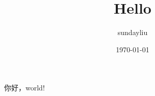 \documentclass[UTF8]{ctexart}
\title{Hello}
\author{sundayliu}
\date{\today}
\begin{document}
\maketitle
你好，world!
\end{document}
